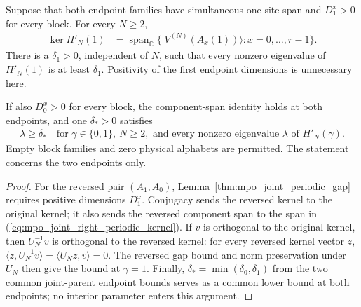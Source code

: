\begin{lemma}
    \label{thm:mpo_joint_both_periodic_endpoints}
    \leanok
    Suppose that both endpoint families have simultaneous one-site span
    and $D_1^x>0$ for every block. For every $N\ge2$,
    \begin{align}
        \ker H'_N(1) & =\operatorname{span}_{\mathbb C}
        \{\lvert V^{(N)}(A_x(1))\rangle:x=0,\ldots,r-1\}.
        \label{eq:mpo_joint_right_periodic_kernel}
    \end{align}
    There is a $\delta_1>0$, independent of $N$, such that every nonzero
    eigenvalue of $H'_N(1)$ is at least $\delta_1$.
    Positivity of the first endpoint dimensions is unnecessary here.

    If also $D_0^x>0$ for every block, the component-span identity
    holds at both endpoints, and one $\delta_*>0$ satisfies
    \begin{align}
        \lambda\ge\delta_*
        \quad\text{for }\gamma\in\{0,1\},\ N\ge2,
        \text{ and every nonzero eigenvalue }\lambda\text{ of }H'_N(\gamma).
        \label{eq:mpo_joint_both_periodic_gap}
    \end{align}
    Empty block families and zero physical alphabets are permitted.
    The statement concerns the two endpoints only.
\end{lemma}
\begin{proof}
    \leanok
    For the reversed pair $(A_1,A_0)$, Lemma~\ref{thm:mpo_joint_periodic_gap}
    requires positive dimensions $D_1^x$.
    Conjugacy sends the reversed kernel to the original kernel; it also
    sends the reversed component span to the span in
    (\ref{eq:mpo_joint_right_periodic_kernel}). If $v$ is orthogonal to the
    original kernel, then $U_N^{-1}v$ is orthogonal to the reversed kernel:
    for every reversed kernel vector $z$,
    $\langle z,U_N^{-1}v\rangle=\langle U_Nz,v\rangle=0$.
    The reversed gap bound and norm preservation under $U_N$ then give the bound at $\gamma=1$.
    Finally, $\delta_*=\min(\delta_0,\delta_1)$ from the two
    common joint-parent endpoint bounds serves as a common lower bound at both endpoints; no interior parameter enters
    this argument.
\end{proof}
